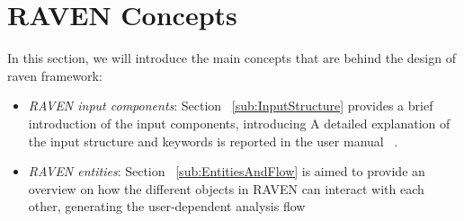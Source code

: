 \section{RAVEN Concepts}
\label{sec:RAVENconcept}
In this section, we will introduce the main concepts that are behind the design of raven framework:
\begin{itemize}
    \item \textit{RAVEN input components}: Section ~\ref{sub:InputStructure} provides a brief introduction of the input components, introducing
    A detailed explanation of the input structure and keywords is reported in the user manual ~\cite{RAVENuserManual}.
    \item \textit{RAVEN entities}: Section ~\ref{sub:EntitiesAndFlow} is aimed to provide an overview on how the different objects in
    RAVEN can interact with each other, generating the user-dependent analysis flow
\end{itemize}
